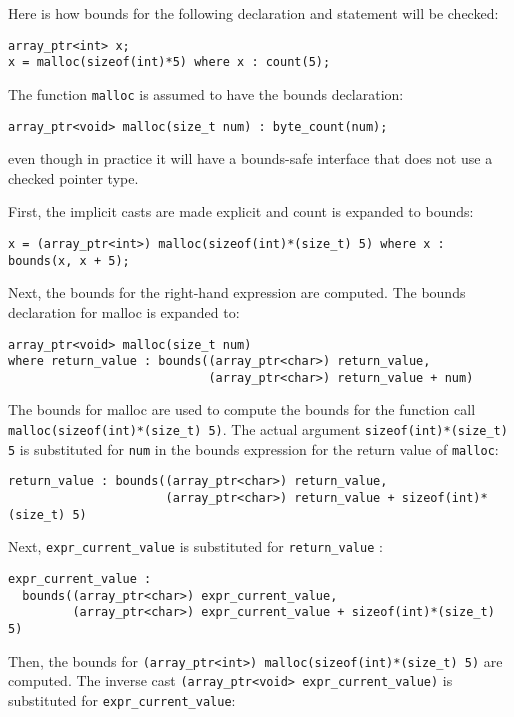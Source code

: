 Here is how bounds for the following declaration and statement will be checked:
\begin{lstlisting}
array_ptr<int> x;
x = malloc(sizeof(int)*5) where x : count(5);
\end{lstlisting}

The function \lstinline+malloc+ is assumed to have the bounds declaration:

\begin{lstlisting}
array_ptr<void> malloc(size_t num) : byte_count(num);
\end{lstlisting}

even though in practice it will have a bounds-safe interface that does
not use a checked pointer type.

First, the implicit casts are made explicit and count is expanded to bounds:

\begin{lstlisting}
x = (array_ptr<int>) malloc(sizeof(int)*(size_t) 5) where x : bounds(x, x + 5);
\end{lstlisting}

Next, the bounds for the right-hand expression are computed. The bounds
declaration for malloc is expanded to:
\begin{lstlisting}
array_ptr<void> malloc(size_t num)  
where return_value : bounds((array_ptr<char>) return_value, 
                            (array_ptr<char>) return_value + num)
\end{lstlisting}

The bounds for malloc are used to compute the bounds for the function
call \lstinline+malloc(sizeof(int)*(size_t) 5)+. The actual argument
\lstinline+sizeof(int)*(size_t) 5+ is substituted for \lstinline+num+ in the
bounds expression for the return value of \lstinline+malloc+:
\begin{lstlisting}
return_value : bounds((array_ptr<char>) return_value, 
                      (array_ptr<char>) return_value + sizeof(int)*(size_t) 5)
\end{lstlisting}

Next, \lstinline+expr_current_value+ is substituted for \lstinline+return_value+ :
\begin{lstlisting}
expr_current_value :
  bounds((array_ptr<char>) expr_current_value,
         (array_ptr<char>) expr_current_value + sizeof(int)*(size_t) 5)
\end{lstlisting}

Then, the bounds for \lstinline|(array_ptr<int>) malloc(sizeof(int)*(size_t) 5)|
are computed. The inverse cast \lstinline|(array_ptr<void> expr_current_value)|
is substituted for \lstinline|expr_current_value|:

